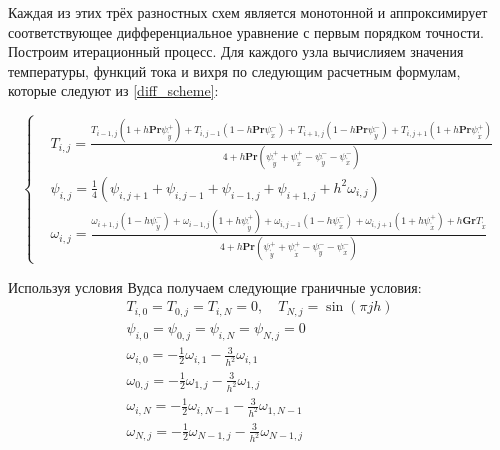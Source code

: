 \documentclass[a4paper, 12pt]{article}
\newcommand{\Pra}{\mathbf{Pr}}
\newcommand{\Gra}{\mathbf{Gr}}
\newcommand{\psp}[2]{\psi_{\mathring{#1}}^{#2}}
\begin{document}
    Каждая из этих трёх разностных схем является монотонной и аппроксимирует
    соответствующее дифференциальное уравнение с первым порядком точности.
    Построим итерационный процесс. Для каждого узла вычислияем значения
    температуры, функций тока и вихря по следующим расчетным формулам, которые
    следуют из \eqref{diff_scheme}:

    \begin{equation}
      \left\{
        \begin{aligned}
          &T_{i,j} =
            \frac{
              T_{i-1,j}\left(
                1 + h \Pra \psp{y}{+}
              \right) +
              T_{i,j-1}\left(
                1 - h \Pra \psp{x}{-}
              \right) +
              T_{i+1,j}\left(
                1 - h \Pra \psp{y}{-}
              \right) +
              T_{i,j+1}\left(
                1 + h \Pra \psp{x}{+}
              \right)
            }{4 + h \Pra \left(
              \psp{y}{+} + \psp{x}{+} - \psp{y}{-} - \psp{x}{-}
            \right)}
          \\
          &\psi_{i,j} = \frac{1}{4} \left(
            \psi_{i,j+1} + \psi_{i,j-1} + \psi_{i-1,j} + \psi_{i+1,j} +
            h^2 \omega_{i,j}
          \right)
          \\
          &\omega_{i,j} =
            \frac{
              \omega_{i+1, j} \left( 1 - h \psp{y}{-} \right) +
              \omega_{i-1, j} \left( 1 + h \psp{y}{+} \right) +
              \omega_{i, j-1} \left( 1 - h \psp{x}{-} \right) +
              \omega_{i, j+1} \left( 1 + h \psp{x}{+} \right) +
              h \Gra T_{\mathring{x}}
            }{4 + h \Pra \left(
              \psp{y}{+} + \psp{x}{+} - \psp{y}{-} - \psp{x}{-}
            \right)}
        \end{aligned}
      \right.
    \end{equation}

    Используя условия Вудса получаем следующие граничные условия:
    \begin{gather*}
      T_{i,0} = T_{0,j} = T_{i,N} = 0, \quad T_{N,j} = \sin (\pi j h)
      \\
      \psi_{i,0} = \psi_{0,j} = \psi_{i,N} = \psi_{N,j} = 0
      \\
      \omega_{i,0} = - \frac{1}{2} \omega_{i,1} - \frac{3}{h^2} \omega_{i,1}
      \\
      \omega_{0,j} = - \frac{1}{2} \omega_{1,j} - \frac{3}{h^2} \omega_{1,j}
      \\
      \omega_{i,N} = - \frac{1}{2} \omega_{i,N-1} - \frac{3}{h^2} \omega_{1,N-1}
      \\
      \omega_{N,j} = - \frac{1}{2} \omega_{N-1,j} - \frac{3}{h^2} \omega_{N-1,j}
      \\
    \end{gather*}
  \pagebreak
\end{document}
